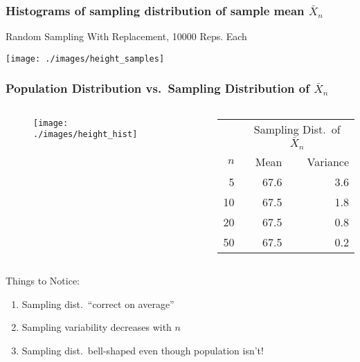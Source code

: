 \begin{frame}
\frametitle{Histograms of sampling distribution of sample mean $\bar{X}_n$}
\alert{Random Sampling With Replacement, 10000 Reps. Each}
\begin{center}
\texttt{[image: ./images/height\_samples]}
\end{center}
\end{frame}
\begin{frame}
\frametitle{Population Distribution vs.\ Sampling Distribution of $\bar{X}_n$}

\begin{columns} 
\begin{column}[c]{6cm} 

\begin{figure}
\centering
\texttt{[image: ./images/height\_hist]}
\end{figure}
\end{column} 
\begin{column}[c]{6cm} 

 \small
\begin{table}
\begin{tabular}{|rrr|}
\hline
&\multicolumn{2}{c|}{Sampling Dist.\ of $\bar{X}_n$}\\
$n$&Mean&Variance\\
\hline
5&67.6&3.6\\
10&67.5&1.8\\
20&67.5&0.8\\
50&67.5&0.2\\
\hline
\end{tabular}
\end{table}

\end{column} 
\end{columns} 
\begin{alertblock}{Things to Notice:}
\begin{enumerate}
	\item Sampling dist.\ ``correct on average'' 
	\item Sampling variability decreases with $n$
  \item Sampling dist.\ bell-shaped even though population isn't!
\end{enumerate}
\end{alertblock}
\end{frame}

